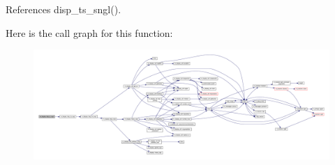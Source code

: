 References disp\+\_\+ts\+\_\+sngl().

Here is the call graph for this function\+:
\nopagebreak
\begin{figure}[H]
\begin{center}
\leavevmode
\includegraphics[width=350pt]{namespacem__display_a7a66451f6a0931ee7552ee4d8918ac20_cgraph}
\end{center}
\end{figure}
\mbox{\label{namespacem__display_adddf4774edf1fedf5b1f02f47fbbc82f}} 

